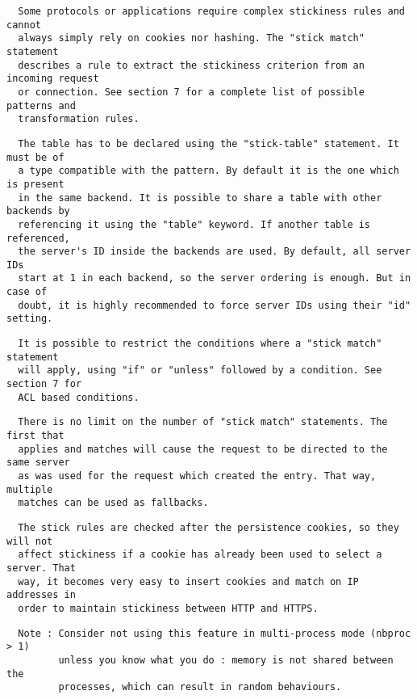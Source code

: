 \begin{verbatim}
  Some protocols or applications require complex stickiness rules and cannot
  always simply rely on cookies nor hashing. The "stick match" statement
  describes a rule to extract the stickiness criterion from an incoming request
  or connection. See section 7 for a complete list of possible patterns and
  transformation rules.
\end{verbatim}

\begin{verbatim}
  The table has to be declared using the "stick-table" statement. It must be of
  a type compatible with the pattern. By default it is the one which is present
  in the same backend. It is possible to share a table with other backends by
  referencing it using the "table" keyword. If another table is referenced,
  the server's ID inside the backends are used. By default, all server IDs
  start at 1 in each backend, so the server ordering is enough. But in case of
  doubt, it is highly recommended to force server IDs using their "id" setting.
\end{verbatim}

\begin{verbatim}
  It is possible to restrict the conditions where a "stick match" statement
  will apply, using "if" or "unless" followed by a condition. See section 7 for
  ACL based conditions.
\end{verbatim}

\begin{verbatim}
  There is no limit on the number of "stick match" statements. The first that
  applies and matches will cause the request to be directed to the same server
  as was used for the request which created the entry. That way, multiple
  matches can be used as fallbacks.
\end{verbatim}

\begin{verbatim}
  The stick rules are checked after the persistence cookies, so they will not
  affect stickiness if a cookie has already been used to select a server. That
  way, it becomes very easy to insert cookies and match on IP addresses in
  order to maintain stickiness between HTTP and HTTPS.
\end{verbatim}

\begin{verbatim}
  Note : Consider not using this feature in multi-process mode (nbproc > 1)
         unless you know what you do : memory is not shared between the
         processes, which can result in random behaviours.
\end{verbatim}

